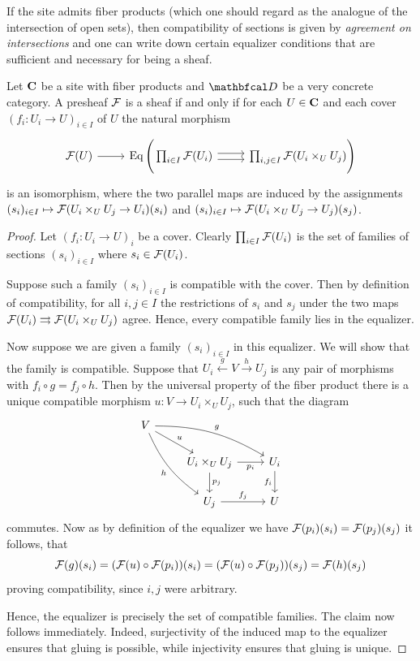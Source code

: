 If the site admits fiber products (which one should regard as the analogue of the intersection of open sets), then compatibility of sections is given by \emph{agreement on intersections} and one can write down certain equalizer conditions that are sufficient and necessary for being a sheaf.
\begin{lemma}
	\label{lemma: being a sheaf is an equalizer condition}

	Let ${{\mathbf{C}}}$ be a site with fiber products and $\category D$ be a very concrete category. A presheaf ${\mathcal{F}}$ is a sheaf if and only if for each $U \in {{\mathbf{C}}}$ and each cover $(f_i \colon U_i \to U)_{i\in I}$ of $U$ the natural morphism
	$$\begin{tikzcd}
		\sheaf F(U) \ar[r] &\equalizer\Bigg(\prod_{i\in I} \sheaf F(U_i) \ar[r, shift left=1.1] \ar[r, shift right=1.1] &\prod_{i, j \in I} \sheaf F(U_i \times_U U_j)\Bigg)
	\end{tikzcd}$$
	is an isomorphism, where the two parallel maps are induced by the assignments $(s_i)_{i\in I}\mapsto {\mathcal{F}}(U_i\times_U U_j \to U_i)(s_i)$ and $(s_i)_{i\in I}\mapsto {\mathcal{F}}(U_i\times_U U_j \to U_j)(s_j)$.
\end{lemma}
\begin{proof}
	Let $(f_i\colon U_i\to U)_i$ be a cover. Clearly $\prod_{i\in I} {\mathcal{F}}(U_i)$ is the set of families of sections $(s_i)_{i\in I}$ where $s_i\in {\mathcal{F}}(U_i)$.
	
	Suppose such a family $(s_i)_{i\in I}$ is compatible with the cover. Then by definition of compatibility, for all $i,j\in I$ the restrictions of $s_i$ and $s_j$ under the two maps ${\mathcal{F}}(U_i)\rightrightarrows {\mathcal{F}}(U_i\times_U U_j)$ agree. Hence, every compatible family lies in the equalizer.
	
	Now suppose we are given a family $(s_i)_{i\in I}$ in this equalizer. We will show that the family is compatible. Suppose that $U_i\xleftarrow g V\xrightarrow h U_j$ is any pair of morphisms with $f_i\circ g=f_j\circ h$. Then by the universal property of the fiber product there is a unique compatible morphism $u\colon V\to U_i\times_U U_j$, such that the diagram
	$$\begin{tikzcd}
		V\ar[dr, "u"]\ar[drr, bend left=15, "g"]\ar[ddr, bend right=15, "h", swap]&&\\
			&U_i\times_U U_j \ar[r, "p_i", swap] \ar[d, "p_j"] &U_i\ar[d, "f_i", swap]\\
			&U_j \ar[r, "f_j"] & U
	\end{tikzcd}$$
	commutes. Now as by definition of the equalizer we have ${\mathcal{F}}(p_i)(s_i)={\mathcal{F}}(p_j)(s_j)$ it follows, that
		$${\mathcal{F}}(g)(s_i)=({\mathcal{F}}(u)\circ {\mathcal{F}}(p_i))(s_i)=({\mathcal{F}}(u)\circ {\mathcal{F}}(p_j))(s_j)={\mathcal{F}}(h)(s_j)$$
	proving compatibility, since $i, j$ were arbitrary.
	
	Hence, the equalizer is precisely the set of compatible families. The claim now follows immediately. Indeed, surjectivity of the induced map to the equalizer ensures that gluing is possible, while injectivity ensures that gluing is unique.
\end{proof}

